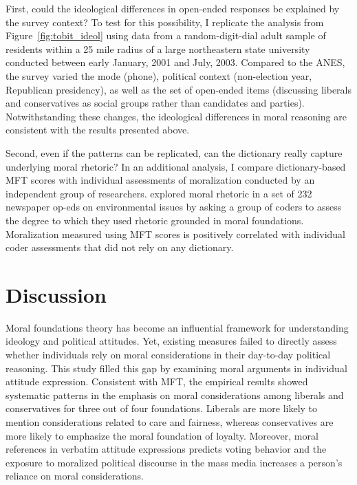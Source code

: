 \documentclass[12pt]{article}
\begin{document}
First, could the ideological differences in open-ended responses be explained by the survey context? To test for this possibility, I replicate the analysis from Figure~\ref{fig:tobit_ideol} using data from a random-digit-dial adult sample of residents within a 25 mile radius of a large northeastern state university conducted between early January, 2001 and July, 2003. Compared to the ANES, the survey varied the mode (phone), political context (non-election year, Republican presidency), as well as the set of open-ended items (discussing liberals and conservatives as social groups rather than candidates and parties). Notwithstanding these changes, the ideological differences in moral reasoning are consistent with the results presented above.

Second, even if the patterns can be replicated, can the dictionary really capture underlying moral rhetoric? In an additional analysis, I compare dictionary-based MFT scores with individual assessments of moralization conducted by an independent group of researchers. \citet{feinberg2013moral} explored moral rhetoric in a set of 232 newspaper op-eds on environmental issues by asking a group of coders to assess the degree to which they used rhetoric grounded in moral foundations. Moralization measured using MFT scores is positively correlated with individual coder assessments that did not rely on any dictionary.


\section*{Discussion}


Moral foundations theory has become an influential framework for understanding ideology and political attitudes. Yet, existing measures failed to directly assess whether individuals rely on moral considerations in their day-to-day political reasoning. This study filled this gap by examining moral arguments in individual attitude expression. Consistent with MFT, the empirical results showed systematic patterns in the emphasis on moral considerations among liberals and conservatives for three out of four foundations. Liberals are more likely to mention considerations related to care and fairness, whereas conservatives are more likely to emphasize the moral foundation of loyalty. Moreover, moral references in verbatim attitude expressions predicts voting behavior and the exposure to moralized political discourse in the mass media increases a person's reliance on moral considerations. 
\end{document}
